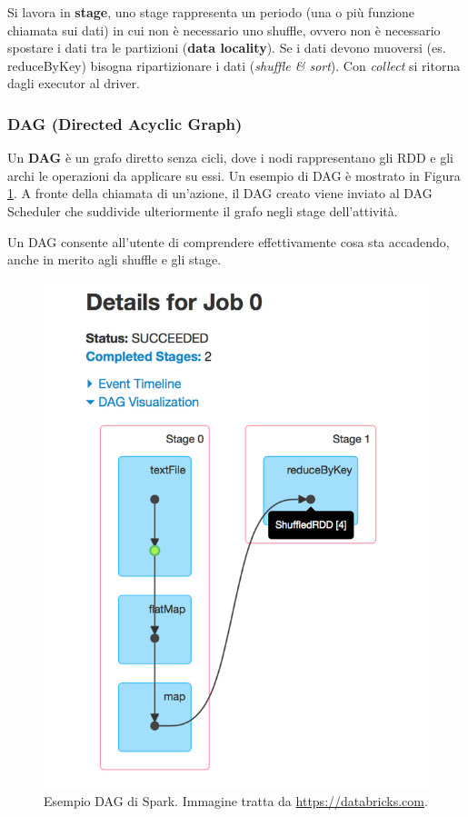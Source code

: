 \documentclass[12pt,italian]{article}
\begin{document}
Si lavora in \textbf{stage}, uno stage rappresenta un periodo (una o più funzione chiamata sui dati) in cui non è necessario uno shuffle, ovvero non è necessario spostare i dati tra le partizioni (\textbf{data locality}). Se i dati devono muoversi (es. reduceByKey) bisogna ripartizionare i dati (\textit{shuffle \& sort}).
Con \textit{collect} si ritorna dagli executor al driver.

\subsubsection{DAG (Directed Acyclic Graph) }\label{sec:DAG}
Un \textbf{DAG} è un grafo diretto senza cicli, dove i nodi rappresentano gli RDD e gli archi le operazioni da applicare su essi. Un esempio di DAG è mostrato in Figura \ref{fig:DAG}.
A fronte della chiamata di un'azione, il DAG creato viene inviato al DAG Scheduler che suddivide ulteriormente il grafo negli stage dell'attività.
\par Un DAG consente all'utente di comprendere effettivamente cosa sta accadendo, anche in merito agli shuffle e gli stage.
\begin{figure}[H]
	\centering 
	\includegraphics[width=0.8\linewidth]{img/DAG.png}
	\caption{Esempio DAG di Spark. Immagine tratta da \url{https://databricks.com}.}
	\label{fig:DAG}
\end{figure}
\end{document}
